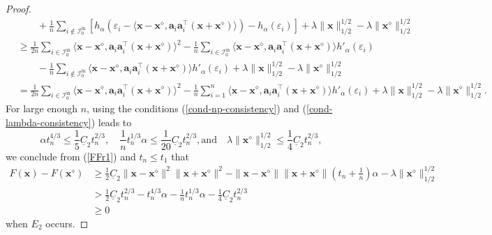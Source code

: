 \documentclass{article}
\numberwithin{equation}{section}
\begin{document}
\begin{proof}
\begin{equation}
\begin{aligned}
			&\qquad+\frac{1}{n}\sum_{i\notin\mathcal{I}_{0}^{\mathrm{in}}}[h_{\alpha}(\varepsilon_i-\langle \mathbf{x}-\mathbf{x}^\diamond, \mathbf{a}_i\mathbf{a}_i^\top(\mathbf{x}+\mathbf{x}^\diamond)\rangle)-h_{\alpha}(\varepsilon_i)]+\lambda\|\mathbf{x}\|_{1/2}^{1/2}-\lambda\|\mathbf{x}^\diamond\|_{1/2}^{1/2}\\
			&\geq\frac{1}{2n}\sum_{i\in\mathcal{I}_{0}^{\mathrm{in}}}\langle \mathbf{x}-\mathbf{x}^\diamond, \mathbf{a}_i\mathbf{a}_i^\top(\mathbf{x}+\mathbf{x}^\diamond)\rangle^2
			-\frac{1}{n}\sum_{i\in\mathcal{I}_{0}^{\mathrm{in}}}\langle \mathbf{x}-\mathbf{x}^\diamond, \mathbf{a}_i\mathbf{a}_i^\top(\mathbf{x}+\mathbf{x}^\diamond)\rangle h'_{\alpha}(\varepsilon_i)\\
			&\qquad-\frac{1}{n}\sum_{i\notin\mathcal{I}_{0}^{\mathrm{in}}}\langle \mathbf{x}-\mathbf{x}^\diamond, \mathbf{a}_i\mathbf{a}_i^\top(\mathbf{x}+\mathbf{x}^\diamond)\rangle h'_{\alpha}(\varepsilon_i)	+\lambda\|\mathbf{x}\|_{1/2}^{1/2}-\lambda\|\mathbf{x}^\diamond\|_{1/2}^{1/2}\\
			&=\frac{1}{2n}\sum_{i\in\mathcal{I}_{0}^{\mathrm{in}}}\langle \mathbf{x}-\mathbf{x}^\diamond, \mathbf{a}_i\mathbf{a}_i^\top(\mathbf{x}+\mathbf{x}^\diamond)\rangle^2
			-\frac{1}{n}\sum_{i=1}^n\langle \mathbf{x}-\mathbf{x}^\diamond, \mathbf{a}_i\mathbf{a}_i^\top(\mathbf{x}+\mathbf{x}^\diamond)\rangle h'_{\alpha}(\varepsilon_i)
			+\lambda\|\mathbf{x}\|_{1/2}^{1/2}-\lambda\|\mathbf{x}^\diamond\|_{1/2}^{1/2}.
		\end{aligned}
	\end{equation}
	For large enough $n$, using the conditions (\ref{cond-np-consistency}) and (\ref{cond-lambda-consistency}) leads to $$\alpha t_n^{4/3}\leq\frac{1}{5}\underline{C}_2t_n^{2/3},\quad \frac{1}{n} t_n^{1/3}\alpha\leq\frac{1}{20}\underline{C}_2t_n^{2/3}, \mbox{and}\quad\lambda\|\mathbf{x}^\diamond\|_{1/2}^{1/2}\leq\frac{1}{4}\underline{C}_2t_n^{2/3},$$
	we conclude from (\ref{FFr1}) and $t_n\leq t_1$ that \begin{equation}
		\begin{aligned}
			F(\mathbf{x})-F(\mathbf{x}^\diamond)
			&\geq\frac{1}{2}\underline{C}_2\|\mathbf{x}-\mathbf{x}^\diamond\|^2\|\mathbf{x}+\mathbf{x}^\diamond\|^2-\|\mathbf{x}-\mathbf{x}^\diamond\|\|\mathbf{x}+\mathbf{x}^\diamond\|(t_n+\frac{1}{n})\alpha
			-\lambda\|\mathbf{x}^\diamond\|_{1/2}^{1/2}\\
			&>\frac{1}{2}\underline{C}_2t_n^{2/3}-t_n^{4/3}\alpha-\frac{1}{n} t_n^{1/3}\alpha
			-\frac{1}{4}\underline{C}_2t_n^{2/3}\\
			&\geq0
		\end{aligned}
	\end{equation}
	 when $E_2$ occurs.
	

\end{proof}
\end{document}
